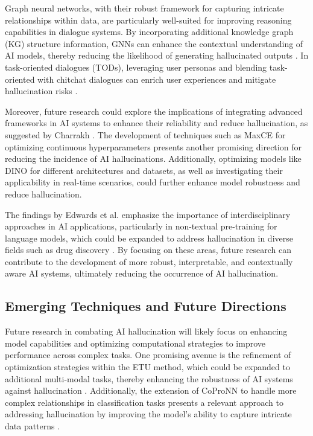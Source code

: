 Graph neural networks, with their robust framework for capturing intricate relationships within data, are particularly well-suited for improving reasoning capabilities in dialogue systems. By incorporating additional knowledge graph (KG) structure information, GNNs can enhance the contextual understanding of AI models, thereby reducing the likelihood of generating hallucinated outputs \cite{chaudhuri2021groundingdialoguesystemsknowledge}. In task-oriented dialogues (TODs), leveraging user personas and blending task-oriented with chitchat dialogues can enrich user experiences and mitigate hallucination risks \cite{tao2024rolecraftglmadvancingpersonalizedroleplaying}.



Moreover, future research could explore the implications of integrating advanced frameworks in AI systems to enhance their reliability and reduce hallucination, as suggested by Charrakh \cite{charrakh2017realitywavefunction}. The development of techniques such as MaxCE for optimizing continuous hyperparameters presents another promising direction for reducing the incidence of AI hallucinations. Additionally, optimizing models like DINO for different architectures and datasets, as well as investigating their applicability in real-time scenarios, could further enhance model robustness and reduce hallucination.



The findings by Edwards et al. emphasize the importance of interdisciplinary approaches in AI applications, particularly in non-textual pre-training for language models, which could be expanded to address hallucination in diverse fields such as drug discovery \cite{edwards2023synergptincontextlearningpersonalized}. By focusing on these areas, future research can contribute to the development of more robust, interpretable, and contextually aware AI systems, ultimately reducing the occurrence of AI hallucination.




\subsection{Emerging Techniques and Future Directions} \label{subsec:Emerging Techniques and Future Directions}

Future research in combating AI hallucination will likely focus on enhancing model capabilities and optimizing computational strategies to improve performance across complex tasks. One promising avenue is the refinement of optimization strategies within the ETU method, which could be expanded to additional multi-modal tasks, thereby enhancing the robustness of AI systems against hallucination \cite{zhang2024universaladversarialperturbationsvisionlanguage}. Additionally, the extension of CoProNN to handle more complex relationships in classification tasks presents a relevant approach to addressing hallucination by improving the model's ability to capture intricate data patterns \cite{chiaburu2024copronnconceptbasedprototypicalnearest}.

